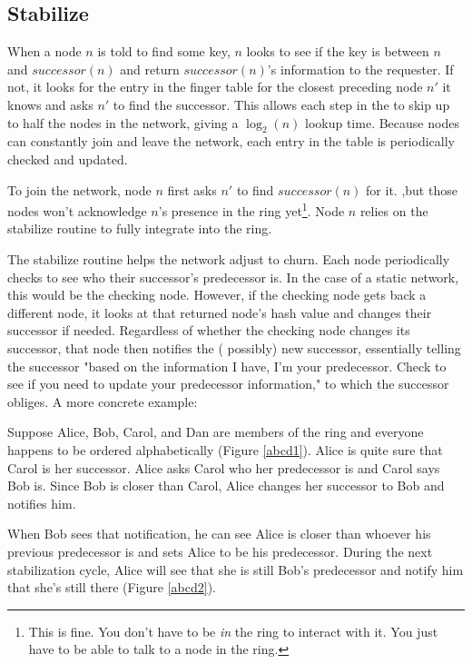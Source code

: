 \documentclass[conference, compsocconf, letterpaper]{IEEEtran}
\begin{document}
\subsection{Stabilize} 

When a node $n$ is told to find some key, $n$ looks to see if the key is between $n$ and $successor(n)$ and return $successor(n)$'s information to the requester. If not, it looks for the entry in the finger table for the closest preceding node $n'$ it knows and asks $n'$ to find the successor.  This allows each step in the to skip up to half the nodes in the network, giving a $\log_2(n)$ lookup time.  Because nodes can constantly join and leave the network, each entry in the table is periodically checked and updated. 

To join the network, node $n$ first asks $n'$ to find $successor(n)$ for it.  ,but those nodes won't  acknowledge $n$'s presence in the ring yet\footnote{This is fine. You don't have to be \emph{in} the ring to interact with it.  You just have to be able to talk to a node in the ring.}.  Node $n$ relies on the stabilize routine to fully integrate into the ring.

The stabilize routine helps the network adjust to churn. Each node periodically checks to see who their successor's predecessor is.  In the case of a static network, this would be the checking node.  However, if the checking node gets back a different node, it looks at that returned node's hash value and changes their successor if needed.  Regardless of whether the checking node changes its successor, that node then notifies the ( possibly) new successor,  essentially telling the successor "based on the information I have, I'm your predecessor.  Check to see if you need to update your predecessor information," to which the successor obliges.  A more concrete example:


Suppose Alice, Bob, Carol, and Dan are members of the ring and everyone happens to be ordered alphabetically (Figure \ref{abcd1}). Alice is quite sure that Carol is her successor.  Alice asks Carol who her predecessor is and Carol says Bob is.  Since Bob is closer than Carol, Alice changes her successor to Bob and notifies him.  

When Bob sees that notification, he can see Alice is closer than whoever his previous predecessor is and sets Alice to be his predecessor.  During the next stabilization cycle, Alice will see that she is still Bob's predecessor and notify him that she's still there (Figure \ref{abcd2}).
\end{document}
